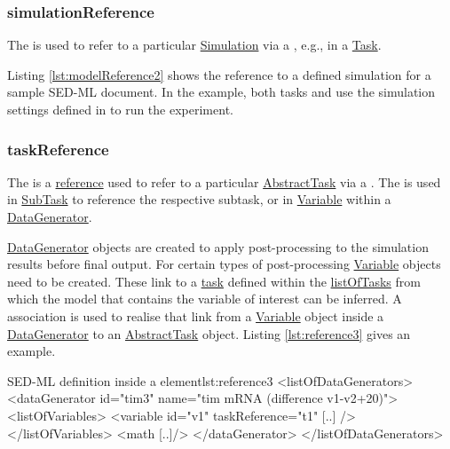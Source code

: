 \subsubsection{simulationReference}
\label{sec:simulationReference}
The  is used to refer to a particular \hyperref[class:simulation]{Simulation}  via a \hyperref[type:sidref]{}, e.g., in a \hyperref[class:task]{Task}. 

Listing \ref{lst:modelReference2} shows the reference to a defined simulation for a sample SED-ML document. In the example, both tasks  and  use the simulation settings defined in  to run the experiment.


\subsubsection{taskReference}
\label{sec:taskReference}
The  is a \hyperref[sec:reference]{reference} used to refer to a particular \hyperref[class:abstractTask]{AbstractTask} via a \hyperref[type:sidref]{}. The  is used in \hyperref[class:subTask]{SubTask} to reference the respective subtask, or in \hyperref[class:variable]{Variable} within a \hyperref[class:dataGenerator]{DataGenerator}.

\hyperref[class:dataGenerator]{DataGenerator} objects are created to apply post-processing to the simulation results before final output. 
For certain types of post-processing \hyperref[class:variable]{Variable} objects need to be created.
These link to a \hyperref[class:abstractTask]{task} defined within the \hyperref[sec:listOfTasks]{listOfTasks} from which the model that contains the variable of interest can be inferred. A  association is used to realise that link from a \hyperref[class:variable]{Variable} object inside a \hyperref[class:dataGenerator]{DataGenerator} to an \hyperref[class:abstractTask]{AbstractTask} object. Listing \ref{lst:reference3} gives an example.

\begin{myXmlLst}{SED-ML  definition inside a  element}{lst:reference3}
<listOfDataGenerators>
	<dataGenerator id="tim3" name="tim mRNA (difference v1-v2+20)">
	<listOfVariables>
   		<variable id="v1" taskReference="t1" [..] />
  	</listOfVariables>
  	<math [..]/>
	</dataGenerator>
</listOfDataGenerators>
\end{myXmlLst}

